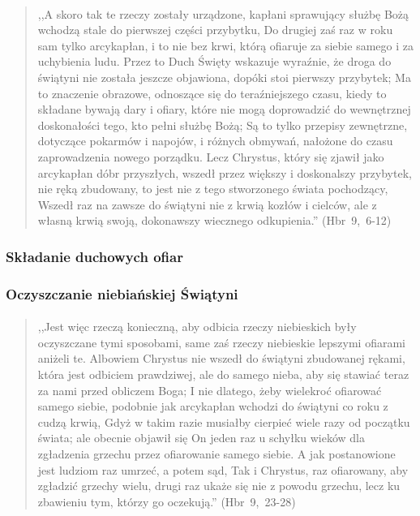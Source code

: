\documentclass[10pt,a4paper,oneside]{article}
\begin{document}
\paragraph{}
\begin{quote}
,,A skoro tak te rzeczy zostały urządzone, kapłani sprawujący służbę Bożą wchodzą stale do pierwszej części przybytku, Do drugiej zaś raz w roku sam tylko arcykapłan, i to nie bez krwi, którą ofiaruje za siebie samego i za uchybienia ludu. Przez to Duch Święty wskazuje wyraźnie, że droga do świątyni nie została jeszcze objawiona, dopóki stoi pierwszy przybytek; Ma to znaczenie obrazowe, odnoszące się do teraźniejszego czasu, kiedy to składane bywają dary i ofiary, które nie mogą doprowadzić do wewnętrznej doskonałości tego, kto pełni służbę Bożą; Są to tylko przepisy zewnętrzne, dotyczące pokarmów i napojów, i różnych obmywań, nałożone do czasu zaprowadzenia nowego porządku. Lecz Chrystus, który się zjawił jako arcykapłan dóbr przyszłych, wszedł przez większy i doskonalszy przybytek, nie ręką zbudowany, to jest nie z tego stworzonego świata pochodzący, Wszedł raz na zawsze do świątyni nie z krwią kozłów i cielców, ale z własną krwią swoją, dokonawszy wiecznego odkupienia.'' \mbox{(Hbr 9, 6-12)}
\end{quote}
\subsubsection{Składanie duchowych ofiar}
\subsubsection{Oczyszczanie niebiańskiej Świątyni}
\paragraph{}
\begin{quote}
,,Jest więc rzeczą konieczną, aby odbicia rzeczy niebieskich były oczyszczane tymi sposobami, same zaś rzeczy niebieskie lepszymi ofiarami aniżeli te. Albowiem Chrystus nie wszedł do świątyni zbudowanej rękami, która jest odbiciem prawdziwej, ale do samego nieba, aby się stawiać teraz za nami przed obliczem Boga; I nie dlatego, żeby wielekroć ofiarować samego siebie, podobnie jak arcykapłan wchodzi do świątyni co roku z cudzą krwią, Gdyż w takim razie musiałby cierpieć wiele razy od początku świata; ale obecnie objawił się On jeden raz u schyłku wieków dla zgładzenia grzechu przez ofiarowanie samego siebie. A jak postanowione jest ludziom raz umrzeć, a potem sąd, Tak i Chrystus, raz ofiarowany, aby zgładzić grzechy wielu, drugi raz ukaże się nie z powodu grzechu, lecz ku zbawieniu tym, którzy go oczekują.'' \mbox{(Hbr 9, 23-28)}
\end{quote}
\end{document}
